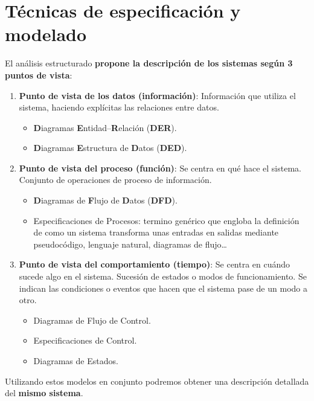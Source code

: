 \section{Técnicas de especificación y modelado}
El análisis estructurado \textbf{propone la descripción de los sistemas según 3 puntos de vista}:
\begin{enumerate}
    \item \textbf{Punto de vista de los datos (información)}: Información que utiliza el sistema, haciendo explícitas las relaciones entre datos.
    \begin{itemize}
        \item \textbf{D}iagramas \textbf{E}ntidad--\textbf{R}elación (\textbf{DER}).
        \item \textbf{D}iagramas \textbf{E}structura de \textbf{D}atos (\textbf{DED}).
    \end{itemize}
    \item \textbf{Punto de vista del proceso (función)}: Se centra en qué hace el sistema. Conjunto de operaciones de proceso de información.
    \begin{itemize}
        \item \textbf{D}iagramas de \textbf{F}lujo de \textbf{D}atos (\textbf{DFD}).
        \item Especificaciones de Procesos: termino genérico que engloba la definición de como un sistema transforma unas entradas en salidas mediante pseudocódigo, lenguaje natural, diagramas de flujo\ldots
    \end{itemize}
    \item \textbf{Punto de vista del comportamiento (tiempo)}: Se centra en cuándo sucede algo en el sistema. Sucesión de estados o modos de funcionamiento. Se indican las condiciones o eventos que hacen que el sistema pase de un modo a otro.
    \begin{itemize}
        \item Diagramas de Flujo de Control.
        \item Especificaciones de Control.
        \item Diagramas de Estados.
    \end{itemize}
\end{enumerate}

Utilizando estos modelos en conjunto podremos obtener una descripción detallada del \textbf{mismo sistema}.

